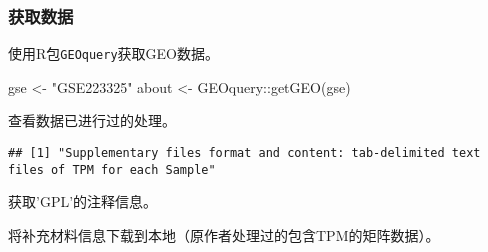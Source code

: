 \documentclass[
]{article}
\newenvironment{Shaded}{\begin{snugshade}}{\end{snugshade}}
\newcommand{\AttributeTok}[1]{\textcolor[rgb]{0.77,0.63,0.00}{#1}}
\newcommand{\DecValTok}[1]{\textcolor[rgb]{0.00,0.00,0.81}{#1}}
\newcommand{\FloatTok}[1]{\textcolor[rgb]{0.00,0.00,0.81}{#1}}
\newcommand{\FunctionTok}[1]{\textcolor[rgb]{0.00,0.00,0.00}{#1}}
\newcommand{\NormalTok}[1]{#1}
\newcommand{\OtherTok}[1]{\textcolor[rgb]{0.56,0.35,0.01}{#1}}
\newcommand{\SpecialCharTok}[1]{\textcolor[rgb]{0.00,0.00,0.00}{#1}}
\newcommand{\StringTok}[1]{\textcolor[rgb]{0.31,0.60,0.02}{#1}}
\begin{document}
\hypertarget{ux83b7ux53d6ux6570ux636e}{%
\subsubsection{获取数据}\label{ux83b7ux53d6ux6570ux636e}}

使用R包\texttt{GEOquery}获取GEO数据。

\begin{Shaded}
\begin{Highlighting}[]
\NormalTok{gse }\OtherTok{\textless{}{-}} \StringTok{"GSE223325"}
\NormalTok{about }\OtherTok{\textless{}{-}}\NormalTok{ GEOquery}\SpecialCharTok{::}\FunctionTok{getGEO}\NormalTok{(gse)}
\end{Highlighting}
\end{Shaded}

查看数据已进行过的处理。

\begin{Shaded}
\end{Shaded}

\begin{verbatim}
## [1] "Supplementary files format and content: tab-delimited text files of TPM for each Sample"
\end{verbatim}

获取'GPL'的注释信息。

\begin{Shaded}
\end{Shaded}

将补充材料信息下载到本地（原作者处理过的包含TPM的矩阵数据）。

\begin{Shaded}
\end{Shaded}
\end{document}
